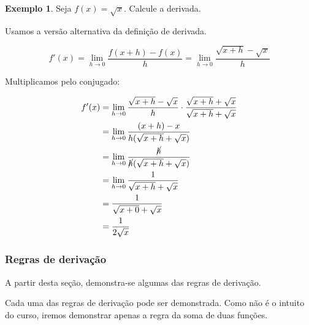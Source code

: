 \documentclass[12pt,openright,twoside,a4paper]{article}
\theoremstyle{definition}
\newtheorem{example}{Exemplo}[section]
\begin{document}
	\begin{example}
		Seja $f(x) = \sqrt{x}$. Calcule a derivada.
	
		
		Usamos a versão alternativa da definição de derivada.
		
		$$
		f'(x) = \lim_{h \to 0} \dfrac{f(x+h) - f(x)}{h} = \lim_{h \to 0} \dfrac{\sqrt{x+h} - \sqrt{x}}{h}
		$$
		
		Multiplicamos pelo conjugado:
		
		\begin{align*}
			f'(x) &= \lim_{h \to 0} \dfrac{\sqrt{x+h} - \sqrt{x}}{h} \cdot \dfrac{\sqrt{x+h} + \sqrt{x}}{\sqrt{x+h} + \sqrt{x}} \\
			&= \lim_{h \to 0} \dfrac{(x+h) - x}{h(\sqrt{x+h} + \sqrt{x})} \\
			&= \lim_{h \to 0} \dfrac{\cancel{h}}{\cancel{h}(\sqrt{x+h} + \sqrt{x})} \\
			&= \lim_{h \to 0} \dfrac{1}{\sqrt{x+h} + \sqrt{x}} \\
			&= \dfrac{1}{\sqrt{x+0} + \sqrt{x}} \\
			&= \dfrac{1}{2\sqrt{x}}
		\end{align*}
	\end{example}

	
	\subsubsection{Regras de derivação}
	A partir desta seção, demonstra-se algumas das regras de derivação.
	
	Cada uma das regras de derivação pode ser demonstrada. Como não é o intuito do curso, iremos demonstrar apenas a regra da soma de duas funções.
	
\end{document}
